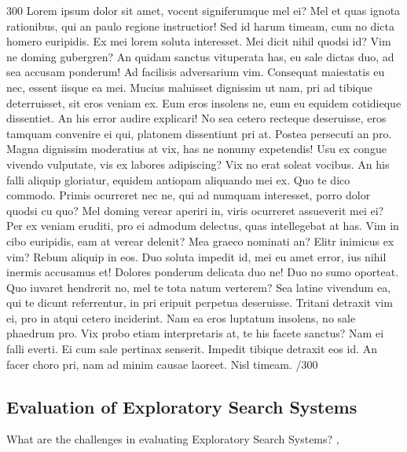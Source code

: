 \documentclass{sigchi}
\begin{document}
300 Lorem ipsum dolor sit amet, vocent signiferumque mel ei? Mel et quas ignota rationibus, qui an paulo regione instructior! Sed id harum timeam, cum no dicta homero euripidis. Ex mei lorem soluta interesset. Mei dicit nihil quodsi id? Vim ne doming gubergren? An quidam sanctus vituperata has, eu sale dictas duo, ad sea accusam ponderum! Ad facilisis adversarium vim. Consequat maiestatis eu nec, essent iisque ea mei. Mucius maluisset dignissim ut nam, pri ad tibique deterruisset, sit eros veniam ex. Eum eros insolens ne, eum eu equidem cotidieque dissentiet. An his error audire explicari! No sea cetero recteque deseruisse, eros tamquam convenire ei qui, platonem dissentiunt pri at. Postea persecuti an pro. Magna dignissim moderatius at vix, has ne nonumy expetendis! Usu ex congue vivendo vulputate, vis ex labores adipiscing? Vix no erat soleat vocibus. An his falli aliquip gloriatur, equidem antiopam aliquando mei ex. Quo te dico commodo. Primis ocurreret nec ne, qui ad numquam interesset, porro dolor quodsi cu quo? Mel doming verear aperiri in, viris ocurreret assueverit mei ei? Per ex veniam eruditi, pro ei admodum delectus, quas intellegebat at has. Vim in cibo euripidis, eam at verear delenit? Mea graeco nominati an? Elitr inimicus ex vim? Rebum aliquip in eos. Duo soluta impedit id, mei eu amet error, ius nihil inermis accusamus et! Dolores ponderum delicata duo ne! Duo no sumo oporteat. Quo iuvaret hendrerit no, mel te tota natum verterem? Sea latine vivendum ea, qui te dicunt referrentur, in pri eripuit perpetua deseruisse. Tritani detraxit vim ei, pro in atqui cetero inciderint. Nam ea eros luptatum insolens, no sale phaedrum pro. Vix probo etiam interpretaris at, te his facete sanctus? Nam ei falli everti. Ei cum sale pertinax senserit. Impedit tibique detraxit eos id. An facer choro pri, nam ad minim causae laoreet. Nisl timeam. /300

\subsection{Evaluation of Exploratory Search Systems}
What are the challenges in evaluating Exploratory Search Systems?
\cite{whitemm08}, \cite{kules08}
\end{document}
